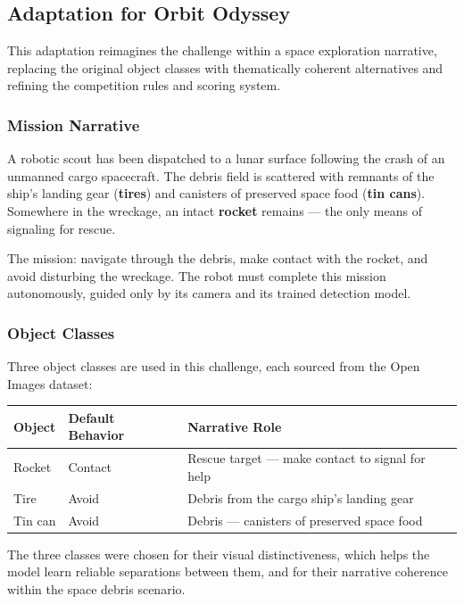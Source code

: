 \documentclass[11pt,a4paper]{article}
\begin{document}
\subsection{Adaptation for Orbit Odyssey}

This adaptation reimagines the challenge within a space exploration narrative, replacing the original object classes with thematically coherent alternatives and refining the competition rules and scoring system.

\subsubsection*{Mission Narrative}

A robotic scout has been dispatched to a lunar surface following the crash of an unmanned cargo spacecraft. The debris field is scattered with remnants of the ship's landing gear (\textbf{tires}) and canisters of preserved space food (\textbf{tin cans}). Somewhere in the wreckage, an intact \textbf{rocket} remains — the only means of signaling for rescue.

The mission: navigate through the debris, make contact with the rocket, and avoid disturbing the wreckage. The robot must complete this mission autonomously, guided only by its camera and its trained detection model.

\subsubsection*{Object Classes}

Three object classes are used in this challenge, each sourced from the Open Images dataset:

\begin{center}
\begin{tabular}{|l|l|l|}
\hline
\textbf{Object} & \textbf{Default Behavior} & \textbf{Narrative Role} \\
\hline
Rocket   & Contact & Rescue target — make contact to signal for help \\
Tire     & Avoid   & Debris from the cargo ship's landing gear \\
Tin can  & Avoid   & Debris — canisters of preserved space food \\
\hline
\end{tabular}
\end{center}

The three classes were chosen for their visual distinctiveness, which helps the model learn reliable separations between them, and for their narrative coherence within the space debris scenario.
\end{document}
